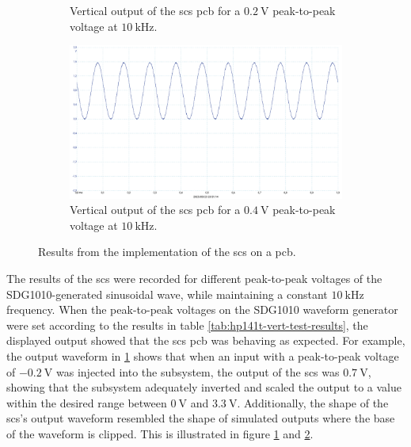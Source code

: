 \documentclass[class=report,11pt,crop=false]{standalone}
\begin{document}
\begin{figure}[h!]
\begin{subfigure}{.32\textwidth}
			\caption{Vertical output of the \acrshort{scs} \acrshort{pcb} for a $\SI{0.2}{\volt}$ peak-to-peak voltage at $\SI{10}{\kilo\hertz}$.}
			\label{fig:scs-output-02Vpp-10kHz}
		\end{subfigure}
		\begin{subfigure}{.32\textwidth}
			\centering
			\includegraphics[width=0.95\linewidth]{Figures/Results/scs-output-04Vpp-10kHz}
			\caption{Vertical output of the \acrshort{scs} \acrshort{pcb} for a $\SI{0.4}{\volt}$ peak-to-peak voltage at $\SI{10}{\kilo\hertz}$.}
			\label{fig:scs-output-04Vpp-10kHz}
		\end{subfigure}
		\caption{Results from the implementation of the \acrshort{scs} on a \acrshort{pcb}.}
		\label{fig:scs-hardware-implementation}
	\end{figure} 
	
	The results of the \acrshort{scs} were recorded for different peak-to-peak voltages of the SDG1010-generated sinusoidal wave, while maintaining a constant $\SI{10}{\kilo\hertz}$ frequency. When the peak-to-peak voltages on the SDG1010 waveform generator were set according to the results in table \ref{tab:hp141t-vert-test-results}, the displayed output showed that the \acrshort{scs} \acrshort{pcb} was behaving as expected. For example, the output waveform in \ref{fig:scs-output-02Vpp-10kHz} shows that when an input with a peak-to-peak voltage of $-\SI{0.2}{\volt}$ was injected into the subsystem, the output of the \acrshort{scs} was $\SI{0.7}{\volt}$, showing that the subsystem adequately inverted and scaled the output to a value within the desired range between $\SI{0}{\volt}$ and $\SI{3.3}{\volt}$. Additionally, the shape of the \acrshort{scs}'s output waveform resembled the shape of simulated outputs where the base of the waveform is clipped. This is illustrated in figure \ref{fig:scs-output-02Vpp-10kHz} and \ref{fig:scs-output-04Vpp-10kHz}.
	
\end{document}
